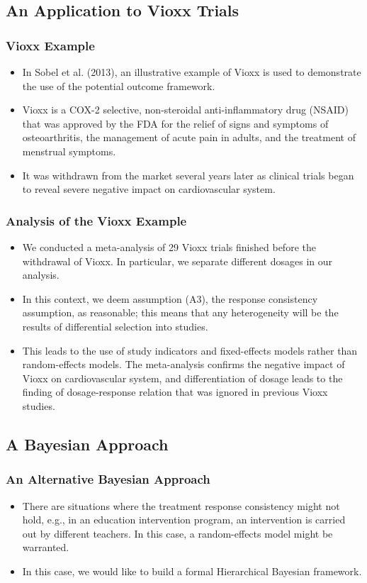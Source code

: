 \documentclass[xetex,mathserif,serif]{beamer}
\begin{document}
\subsection{An Application to Vioxx Trials}
\begin{frame}
  \frametitle{Vioxx Example}
  \begin{itemize}
  \item In Sobel et al. (2013), an illustrative example of Vioxx is used to
    demonstrate the use of the potential outcome framework.
  \item Vioxx is a COX-2 selective, non-steroidal anti-inflammatory drug (NSAID)
    that was approved by the FDA for the relief of signs and symptoms of
    osteoarthritis, the management of acute pain in adults, and the treatment of
    menstrual symptoms.
  \item It was withdrawn from the market several years later as clinical trials
    began to reveal severe negative impact on cardiovascular system.
  \end{itemize}
\end{frame}

\begin{frame}
  \frametitle{Analysis of the Vioxx Example}
  \begin{itemize}
  \item We conducted a meta-analysis of 29 Vioxx trials finished before the
    withdrawal of Vioxx. In particular, we separate different dosages in our
    analysis.  \pause
  \item In this context, we deem assumption (A3), the response consistency
    assumption, as reasonable; this means that any heterogeneity will be the
    results of differential selection into studies.  
    \pause
  \item This leads to the use of study indicators and fixed-effects models rather
    than random-effects models. The meta-analysis confirms the negative impact of
    Vioxx on cardiovascular system, and differentiation of dosage leads to the
    finding of dosage-response relation that was ignored in previous Vioxx
    studies.
  \end{itemize}
\end{frame}
\subsection{A Bayesian Approach}
\begin{frame}
  \frametitle{An Alternative Bayesian Approach}
  \begin{itemize}
  \item There are situations where the treatment response consistency might not
    hold, e.g., in an education intervention program, an intervention is carried
    out by different teachers. In this case, a random-effects model might be
    warranted.
    \pause
  \item In this case, we would like to build a formal Hierarchical Bayesian
    framework.
  \end{itemize}
\end{frame}
\end{document}
